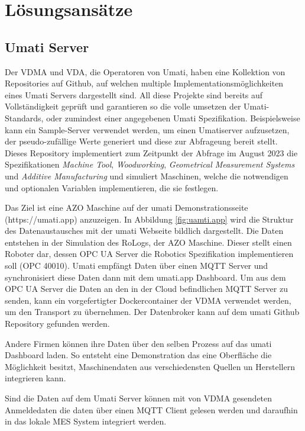 \documentclass[a4paper, 12pt, oneside]{scrbook}
\begin{document}
	
	\section{Lösungsansätze}
	
		\subsection{Umati Server}
		
		Der VDMA und VDA, die Operatoren von Umati, haben eine Kollektion von Repositories auf Github, auf welchen multiple Implementationsmöglichkeiten eines Umati Servers dargestellt sind. \cite{noauthor_github_nodate} All diese Projekte sind bereits auf Vollständigkeit geprüft und garantieren so die volle umsetzen der Umati-Standards, oder zumindest einer angegebenen Umati Spezifikation. Beispielsweise kann ein Sample-Server verwendet werden, um einen Umatiserver aufzusetzen, der pseudo-zufällige Werte generiert und diese zur Abfrageung bereit stellt. Dieses Repository implementiert zum Zeitpunkt der Abfrage im August 2023 die Spezifikationen \textit{Machine Tool}, \textit{Woodworking}, \textit{Geometrical Measurement Systems} und \textit{Additive Manufacturing} und simuliert Maschinen, welche die notwendigen und optionalen Variablen implementieren, die sie festlegen.
		
		Das Ziel ist eine AZO Maschine auf der umati Demonstrationsseite (https://umati.app) anzuzeigen. In Abbildung \ref{fig:uamti.app} wird die Struktur des Datenaustausches mit der umati Webseite bildlich dargestellt. Die Daten entstehen in der Simulation des RoLogs, der AZO Maschine. Dieser stellt einen Roboter dar, dessen OPC UA Server die Robotics Spezifikation implementieren soll (OPC 40010). Umati empfängt Daten über einen MQTT Server und synchronisiert diese Daten dann mit dem umati.app Dashboard. Um aus dem OPC UA Server die Daten an den in der Cloud befindlichen MQTT Server zu senden, kann ein vorgefertigter Dockercontainer der VDMA verwendet werden, um den Transport zu übernehmen. Der Datenbroker kann auf dem umati Github Repository gefunden werden.
		
		Andere Firmen können ihre Daten über den selben Prozess auf das umati Dashboard laden. So entsteht eine Demonstration das eine Oberfläche die Möglichkeit besitzt, Maschinendaten aus verschiedensten Quellen un Herstellern integrieren kann. 
		
		Sind die Daten auf dem Umati Server können mit von VDMA gesendeten Anmeldedaten die daten über einen MQTT Client gelesen werden und daraufhin in das lokale MES System integriert werden.
				
\end{document}
